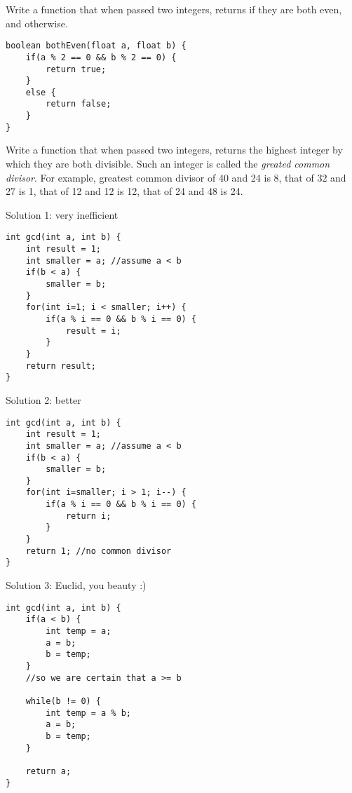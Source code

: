 \begin{questions}
\question Write a function that when passed two integers, returns  if they are both even, and  otherwise.

\begin{solution}
\begin{lstlisting}
boolean bothEven(float a, float b) {
	if(a % 2 == 0 && b % 2 == 0) {
		return true;
	}
	else {
		return false;
	}
}	
\end{lstlisting}
\end{solution}

\question Write a function that when passed two integers, returns the highest integer by which they are both divisible. Such an integer is called the \emph{greated common divisor}. For example, greatest common divisor of 40 and 24 is 8, that of 32 and 27 is 1, that of 12 and 12 is 12, that of 24 and 48 is 24.

\begin{solution}
Solution 1: very inefficient
\begin{lstlisting}
int gcd(int a, int b) {
	int result = 1;
	int smaller = a; //assume a < b
	if(b < a) {
		smaller = b;
	}
	for(int i=1; i < smaller; i++) {
		if(a % i == 0 && b % i == 0) {
			result = i;
		}
	}
	return result;
}
\end{lstlisting}	

Solution 2: better
\begin{lstlisting}
int gcd(int a, int b) {
	int result = 1;
	int smaller = a; //assume a < b
	if(b < a) {
		smaller = b;
	}
	for(int i=smaller; i > 1; i--) {
		if(a % i == 0 && b % i == 0) {
			return i;
		}
	}
	return 1; //no common divisor
}
\end{lstlisting}	

Solution 3: Euclid, you beauty :)
\begin{lstlisting}
int gcd(int a, int b) {
	if(a < b) {
		int temp = a;
		a = b;
		b = temp;
	}
	//so we are certain that a >= b
	
	while(b != 0) {
		int temp = a % b;
		a = b;
		b = temp;
	}
	
	return a;
}
\end{lstlisting}	
\end{solution}

\end{questions}